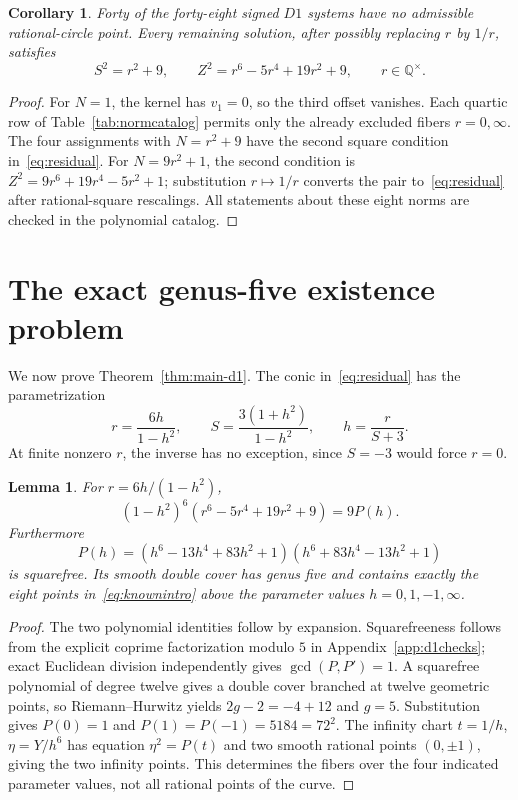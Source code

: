 \documentclass[11pt,letterpaper]{article}
\newtheorem{lemma}[theorem]{Lemma}
\newtheorem{corollary}[theorem]{Corollary}
\theoremstyle{definition}\newtheorem{definition}[theorem]{Definition}
\theoremstyle{remark}\newtheorem{remark}[theorem]{Remark}
\newcommand{\Q}{\mathbb Q}\newcommand{\Z}{\mathbb Z}\newcommand{\R}{\mathbb R}
\begin{document}
\begin{corollary}\label{cor:forty}
Forty of the forty-eight signed $D1$ systems have no admissible rational-circle point. Every remaining solution, after possibly replacing $r$ by $1/r$, satisfies
\begin{equation}\label{eq:residual}
 S^2=r^2+9,\qquad
 Z^2=r^6-5r^4+19r^2+9,\qquad r\in\Q^\times.
\end{equation}
\end{corollary}
\begin{proof}
For $N=1$, the kernel has $v_1=0$, so the third offset vanishes. Each quartic row of Table~\ref{tab:normcatalog} permits only the already excluded fibers $r=0,\infty$. The four assignments with $N=r^2+9$ have the second square condition in~\eqref{eq:residual}. For $N=9r^2+1$, the second condition is $Z^2=9r^6+19r^4-5r^2+1$; substitution $r\mapsto1/r$ converts the pair to~\eqref{eq:residual} after rational-square rescalings. All statements about these eight norms are checked in the polynomial catalog.
\end{proof}

\section{The exact genus-five existence problem}\label{sec:genusfive}
We now prove Theorem~\ref{thm:main-d1}. The conic in~\eqref{eq:residual} has the parametrization
\begin{equation}\label{eq:conic}
 r=\frac{6h}{1-h^2},\qquad
 S=\frac{3(1+h^2)}{1-h^2},\qquad
 h=\frac{r}{S+3}.
\end{equation}
At finite nonzero $r$, the inverse has no exception, since $S=-3$ would force $r=0$.

\begin{lemma}\label{lem:pullback}
For $r=6h/(1-h^2)$,
\[
 (1-h^2)^6(r^6-5r^4+19r^2+9)=9P(h).
\]
Furthermore
\[
 P(h)=(h^6-13h^4+83h^2+1)(h^6+83h^4-13h^2+1)
\]
is squarefree. Its smooth double cover has genus five and contains exactly the eight points in~\eqref{eq:knownintro} above the parameter values $h=0,1,-1,\infty$.
\end{lemma}
\begin{proof}
The two polynomial identities follow by expansion. Squarefreeness follows from the explicit coprime factorization modulo $5$ in Appendix~\ref{app:d1checks}; exact Euclidean division independently gives $\gcd(P,P')=1$. A squarefree polynomial of degree twelve gives a double cover branched at twelve geometric points, so Riemann--Hurwitz yields $2g-2=-4+12$ and $g=5$. Substitution gives $P(0)=1$ and $P(1)=P(-1)=5184=72^2$. The infinity chart $t=1/h$, $\eta=Y/h^6$ has equation $\eta^2=P(t)$ and two smooth rational points $(0,\pm1)$, giving the two infinity points. This determines the fibers over the four indicated parameter values, not all rational points of the curve.
\end{proof}
\end{document}
